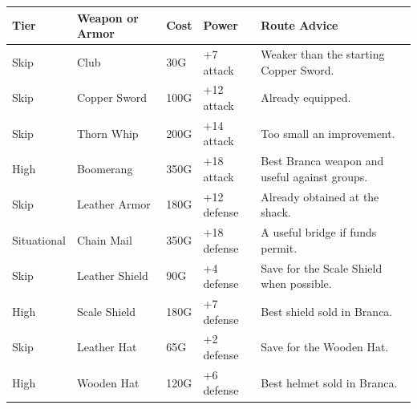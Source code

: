 \documentclass[
  american,
  10pt,
  letterpaper,
  oneside,
  open=any]{scrreprt}
\newcounter{none} %
\newenvironment{guidetable}{%
  \small\setstretch{1.0}%
  \setlength{\tabcolsep}{4pt}%
  \setlength{\LTpre}{8pt}\setlength{\LTpost}{10pt}%
  \renewcommand{\arraystretch}{1.16}%
}{ }
\begin{document}
\begin{guidetable}

{\def\LTcaptype{none} %
\begin{longtable}[]{@{}
  >{\raggedright\arraybackslash}p{}
  >{\raggedright\arraybackslash}p{}
  >{\raggedleft\arraybackslash}p{}
  >{\raggedleft\arraybackslash}p{}
  >{\raggedright\arraybackslash}p{}@{}}
\toprule\noalign{}
\begin{minipage}[b]{\linewidth}\raggedright
\color{GuideGreen}\bfseries Tier
\end{minipage} & \begin{minipage}[b]{\linewidth}\raggedright
\color{GuideGreen}\bfseries Weapon or Armor
\end{minipage} & \begin{minipage}[b]{\linewidth}\raggedleft
\color{GuideGreen}\bfseries Cost
\end{minipage} & \begin{minipage}[b]{\linewidth}\raggedleft
\color{GuideGreen}\bfseries Power
\end{minipage} & \begin{minipage}[b]{\linewidth}\raggedright
\color{GuideGreen}\bfseries Route Advice
\end{minipage} \\
\midrule\noalign{}
\endhead
\bottomrule\noalign{}
\endlastfoot
Skip & Club & 30G & +7 attack & Weaker than the starting Copper
Sword. \\
Skip & Copper Sword & 100G & +12 attack & Already equipped. \\
Skip & Thorn Whip & 200G & +14 attack & Too small an improvement. \\
High & Boomerang & 350G & +18 attack & Best Branca weapon and useful
against groups. \\
Skip & Leather Armor & 180G & +12 defense & Already obtained at the
shack. \\
Situational & Chain Mail & 350G & +18 defense & A useful bridge if funds
permit. \\
Skip & Leather Shield & 90G & +4 defense & Save for the Scale Shield
when possible. \\
High & Scale Shield & 180G & +7 defense & Best shield sold in Branca. \\
Skip & Leather Hat & 65G & +2 defense & Save for the Wooden Hat. \\
High & Wooden Hat & 120G & +6 defense & Best helmet sold in Branca. \\
\end{longtable}
}

\end{guidetable}
\end{document}
